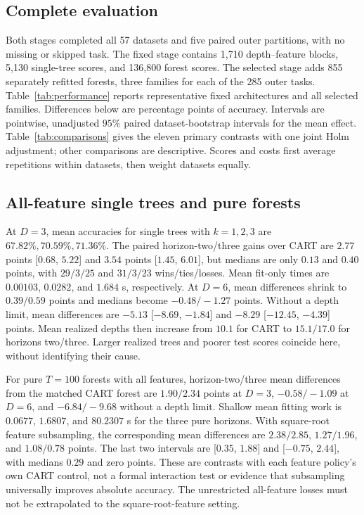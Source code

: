 
\subsection{Complete evaluation}
Both stages completed all 57 datasets and five paired outer partitions,
with no missing or skipped task. The fixed stage contains 1,710
depth--feature blocks, 5,130 single-tree scores, and 136,800 forest
scores. The selected stage adds 855 separately refitted forests, three
families for each of the 285 outer tasks. Table~\ref{tab:performance}
reports representative fixed architectures and all selected families.
Differences below are percentage points of accuracy. Intervals are
pointwise, unadjusted $95\%$ paired dataset-bootstrap intervals for
the mean effect. Table~\ref{tab:comparisons} gives the eleven primary
contrasts with one joint Holm adjustment; other comparisons are descriptive.
Scores and costs first average repetitions within datasets, then weight
datasets equally.

\subsection{All-feature single trees and pure forests}
At $D=3$, mean accuracies for single trees with $k=1,2,3$ are
$67.82\%,70.59\%,71.36\%$. The paired horizon-two/three gains over
CART are $2.77$ points [$0.68$, $5.22$] and $3.54$ points [$1.45$,
$6.01$], but medians are only $0.13$ and $0.40$ points, with
$29/3/25$ and $31/3/23$ wins/ties/losses. Mean fit-only times are
$0.00103$, $0.0282$, and $1.684$ s, respectively. At $D=6$, mean
differences shrink to $0.39/0.59$ points and medians become
$-0.48/-1.27$ points. Without a depth limit, mean differences are
$-5.13$ [$-8.69$, $-1.84$] and $-8.29$ [$-12.45$, $-4.39$]
points. Mean realized depths then increase from $10.1$ for CART to
$15.1/17.0$ for horizons two/three. Larger realized trees and poorer
test scores coincide here, without identifying their cause.

For pure $T=100$ forests with all features, horizon-two/three mean
differences from the matched CART forest are $1.90/2.34$ points at
$D=3$, $-0.58/-1.09$ at $D=6$, and $-6.84/-9.68$ without a depth
limit. Shallow mean fitting work is $0.0677$, $1.6807$, and $80.2307$
s for the three pure horizons. With square-root feature subsampling,
the corresponding mean differences are $2.38/2.85$, $1.27/1.96$,
and $1.08/0.78$ points. The last two intervals are [$0.35$, $1.88$]
and [$-0.75$, $2.44$], with medians $0.29$ and zero points.
These are contrasts with each feature policy's own CART control,
not a formal interaction test or evidence that subsampling universally
improves absolute accuracy. The unrestricted all-feature losses must
not be extrapolated to the square-root-feature setting.

